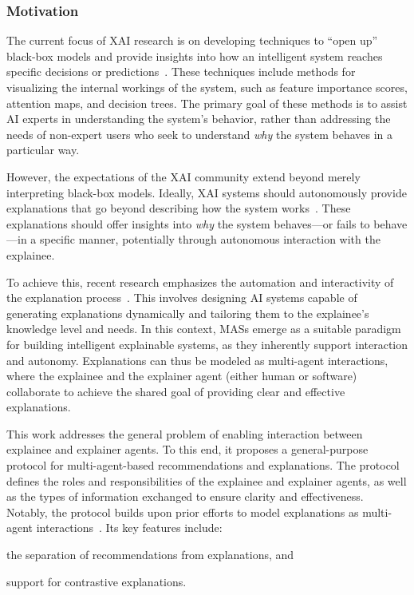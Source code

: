 \subsubsection{Motivation}\label{subsubsec:introduction-general-purpose-protocol-for-multi-agent-based-explanations}
%
The current focus of \gls{XAI} research is on developing techniques to ``open up'' black-box models and provide insights into how an intelligent system reaches specific decisions or predictions~\cite{citation_needed}.
%
These techniques include methods for visualizing the internal workings of the system, such as feature importance scores, attention maps, and decision trees.
%
The primary goal of these methods is to assist \gls{AI} experts in understanding the system's behavior, rather than addressing the needs of non-expert users who seek to understand \emph{why} the system behaves in a particular way.

However, the expectations of the \gls{XAI} community extend beyond merely interpreting black-box models.
%
Ideally, \gls{XAI} systems should autonomously provide explanations that go beyond describing how the system works~\cite{citation_needed}.
%
These explanations should offer insights into \emph{why} the system behaves—or fails to behave—in a specific manner, potentially through autonomous interaction with the explainee.

To achieve this, recent research emphasizes the automation and interactivity of the explanation process~\cite{citation_needed}.
%
This involves designing \gls{AI} systems capable of generating explanations dynamically and tailoring them to the explainee's knowledge level and needs.
%
In this context, \glspl{MAS} emerge as a suitable paradigm for building intelligent explainable systems, as they inherently support interaction and autonomy.
%
Explanations can thus be modeled as multi-agent interactions, where the explainee and the explainer agent (either human or software) collaborate to achieve the shared goal of providing clear and effective explanations.

This work addresses the general problem of enabling interaction between explainee and explainer agents.
%
To this end, it proposes a general-purpose protocol for multi-agent-based recommendations and explanations.
%
The protocol defines the roles and responsibilities of the explainee and explainer agents, as well as the types of information exchanged to ensure clarity and effectiveness.
%
Notably, the protocol builds upon prior efforts to model explanations as multi-agent interactions~\cite{citation_needed}.
%
Its key features include:
%
\begin{inlinelist}
    \item the separation of recommendations from explanations, and
    \item support for contrastive explanations.
\end{inlinelist}

